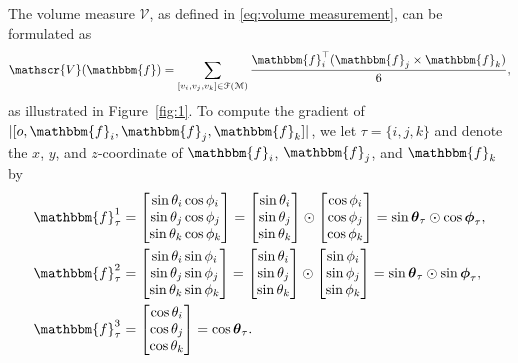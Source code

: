 \documentclass{article}
\numberwithin{equation}{section}
\def\bf{\mathbbm{f}}
\def\F{\mathcal{F}}
\def\M{\mathcal{M}}
\def\bV{\mathscr{V}}
\def\bphi{{\boldsymbol{\phi}}}
\def\btheta{{\boldsymbol{\theta}}}
\begin{document}
The volume measure $\bV$, as defined in \eqref{eq:volume measurement}, can be formulated as 
\begin{equation}
\bV(\bf) 
= \sum_{[v_i, v_j, v_k]\in\F(\M)} \frac{\bf_i^\top (\bf_j \times \bf_k)}{6},
\label{eq:Vol_formulate}
\end{equation}
as illustrated in Figure~\ref{fig:1}.
To compute the gradient of $|[o, \bf_i, \bf_j, \bf_k]|$, we let $\tau = \{i, j, k\}$ and denote the $x$, $y$, and $z$-coordinate of $\bf_i$, $\bf_j$, and $\bf_k$ by
\begin{subequations} \label{eq:4:16}
\begin{align}
\bf_\tau^1 &= 
\begin{bmatrix}
\sin \theta_i \cos \phi_i \\
\sin \theta_j \cos \phi_j \\
\sin \theta_k \cos \phi_k \\
\end{bmatrix} 
= \begin{bmatrix}
\sin \theta_i \\
\sin \theta_j \\
\sin \theta_k \\
\end{bmatrix}
\odot
\begin{bmatrix}
\cos \phi_i \\
\cos \phi_j \\
\cos \phi_k \\
\end{bmatrix}
= \sin\btheta_\tau \odot \cos\bphi_\tau,\\
\bf_\tau^2 &= 
\begin{bmatrix}
\sin \theta_i \sin \phi_i \\
\sin \theta_j \sin \phi_j \\
\sin \theta_k \sin \phi_k \\
\end{bmatrix} 
= \begin{bmatrix}
\sin \theta_i \\
\sin \theta_j \\
\sin \theta_k \\
\end{bmatrix}
\odot
\begin{bmatrix}
\sin \phi_i \\
\sin \phi_j \\
\sin \phi_k \\
\end{bmatrix}
=  \sin\btheta_\tau \odot \sin\bphi_\tau,\\
\bf_\tau^3 &= 
\begin{bmatrix}
\cos \theta_i \\ 
\cos \theta_j \\ 
\cos \theta_k 
\end{bmatrix} = \cos \btheta_\tau.
\end{align}
\end{subequations}
\end{document}
